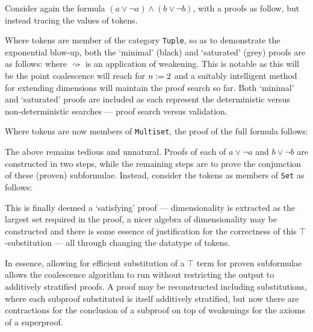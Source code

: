     \begin{examples}
        Consider again the formula $(a \vee \neg a) \wedge (b \vee \neg b)$, with a proofs as follow, but instead tracing the values of tokens.
        
        Where tokens are member of the category \texttt{Tuple}, so as to demonstrate the exponential blow-up, both the `minimal' (black) and `saturated' (grey) proofs are as follows:
         where $\rightsquigarrow$ is an application of weakening.
        This is notable as this will be the point coalescence will reach for $n := 2$ and a suitably intelligent method for extending dimensions will maintain the proof search so far.
        Both `minimal' and `saturated' proofs are included as each represent the deterministic versus non-deterministic searches --- proof search versus validation.

        Where tokens are now members of \texttt{Multiset}, the proof of the full formula follows:
        
        The above remains tedious and unnatural.
        Proofs of each of $a \vee \neg a$ and $b \vee \neg b$ are constructed in two steps, while the remaining steps are to prove the conjunction of these (proven) subformulae.
        Instead, consider the tokens as members of \texttt{Set} as follows:

        
        This is finally deemed a `satisfying' proof --- dimensionality is extracted as the largest set required in the proof, a nicer algebra of dimensionality may be constructed and there is some essence of justification for the correctness of this $\top$-substitution --- all through changing the datatype of tokens.
    \end{examples}
    
    \begin{remark}
        In essence, allowing for efficient substitution of a $\top$ term for proven subformulae allows the coalescence algorithm to run without restricting the output to additively stratified proofs.
        A proof may be reconstructed including substitutions, where each subproof substituted is itself additively stratified, but now there are contractions for the conclusion of a subproof on top of weakenings for the axioms of a superproof.
    \end{remark}


